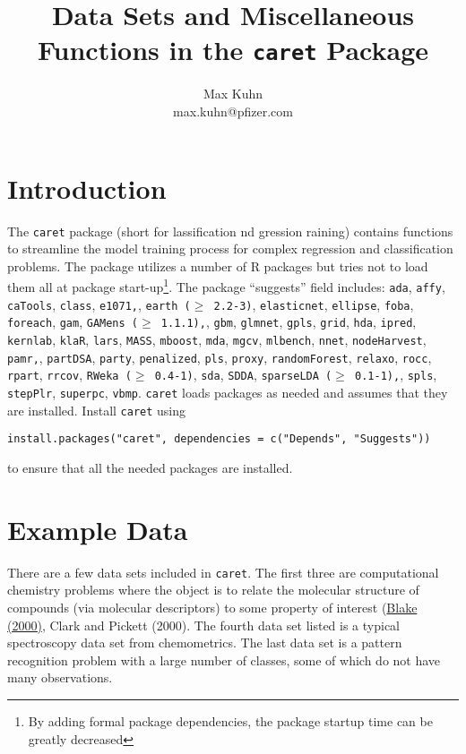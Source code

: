 \documentclass[12pt]{article}
\title{Data Sets and Miscellaneous Functions in the {\tt caret} Package}
\author{Max Kuhn \\ max.kuhn@pfizer.com}
\begin{document}
\maketitle

\thispagestyle{empty}
	
\section{Introduction}


The \texttt{caret} package (short for {\bf{\color{blue}{c}}}lassification {\bf{\color{blue}{a}}}nd {\bf{\color{blue}{re}}}gression {\bf{\color{blue}{t}}}raining) contains functions to streamline the model training process for complex regression and classification problems. The package utilizes a number of R packages but tries not to load them all at package start-up\footnote{By adding formal package dependencies, the package startup time can be greatly decreased}. The package ``suggests'' field includes: \texttt{ada}, \texttt{affy}, \texttt{caTools}, \texttt{class}, \texttt{e1071,}, \texttt{earth ($\ge$ 2.2-3)}, \texttt{elasticnet}, \texttt{ellipse}, \texttt{foba}, \texttt{foreach}, \texttt{gam}, \texttt{GAMens ($\ge$ 1.1.1),}, \texttt{gbm}, \texttt{glmnet}, \texttt{gpls}, \texttt{grid}, \texttt{hda}, \texttt{ipred}, \texttt{kernlab}, \texttt{klaR}, \texttt{lars}, \texttt{MASS}, \texttt{mboost}, \texttt{mda}, \texttt{mgcv}, \texttt{mlbench}, \texttt{nnet}, \texttt{nodeHarvest}, \texttt{pamr,}, \texttt{partDSA}, \texttt{party}, \texttt{penalized}, \texttt{pls}, \texttt{proxy}, \texttt{randomForest}, \texttt{relaxo}, \texttt{rocc}, \texttt{rpart}, \texttt{rrcov}, \texttt{RWeka ($\ge$ 0.4-1)}, \texttt{sda}, \texttt{SDDA}, \texttt{sparseLDA ($\ge$ 0.1-1),}, \texttt{spls}, \texttt{stepPlr}, \texttt{superpc}, \texttt{vbmp}. \texttt{caret} loads packages as needed and assumes that they are installed. Install \texttt{caret} using 
\begin{Verbatim}
install.packages("caret", dependencies = c("Depends", "Suggests"))
\end{Verbatim}
to ensure that all the needed packages are installed.


\section{Example Data}

There are a few data sets included in \texttt{caret}. The first three are computational chemistry problems where the object is to relate the molecular structure of compounds (via molecular descriptors) to some property of interest (\href{ http://dx.doi.org/10.1016/S1359-6446(99)01451-8}{Blake (2000)}, Clark and Pickett (2000). The fourth data set listed is a typical spectroscopy data set from chemometrics. The last data set is a pattern recognition problem with a large number of classes, some of which do not have many observations.
\end{document}
